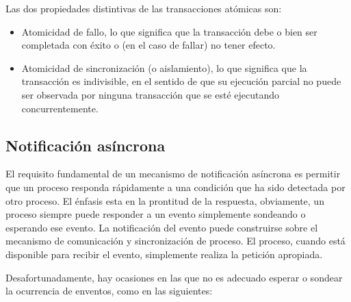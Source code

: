 Las dos propiedades distintivas de las transacciones atómicas son:

\begin{itemize}
	\item Atomicidad de fallo, lo que significa que la transacción debe o
		bien ser completada con éxito o (en el caso de fallar) no tener
		efecto.
	\item Atomicidad de sincronización (o aislamiento), lo que significa
		que la transacción es indivisible, en el sentido de que su
		ejecución parcial no puede ser observada por ninguna transacción
		que se esté ejecutando concurrentemente.
\end{itemize}

\subsection{Notificación asíncrona}

El requisito fundamental de un mecanismo de notificación asíncrona es permitir
que un proceso responda rápidamente a una condición que ha sido detectada por
otro proceso. El énfasis esta en la prontitud de la respuesta, obviamente, un
proceso siempre puede responder a un evento simplemente sondeando o esperando
ese evento. La notificación del evento puede construirse sobre el mecanismo de
comunicación y sincronización de proceso. El proceso, cuando está disponible
para recibir el evento, simplemente realiza la petición apropiada.

Desafortunadamente, hay ocasiones en las que no es adecuado esperar o sondear la
ocurrencia de enventos, como en las siguientes:

